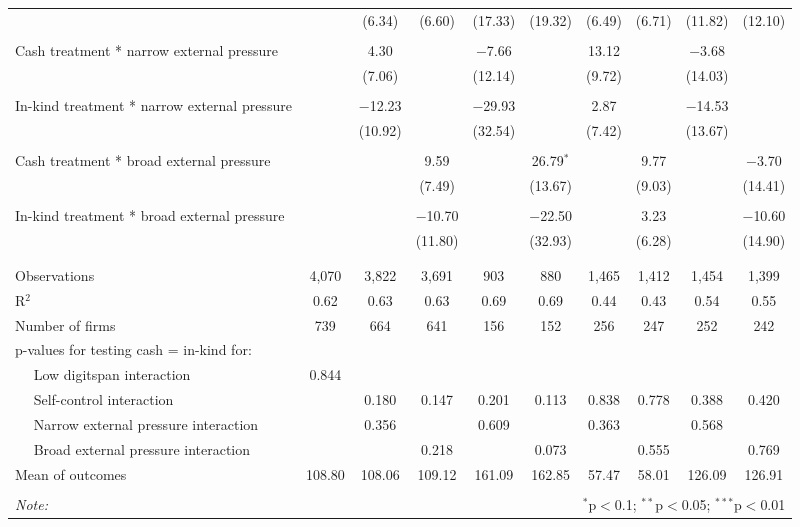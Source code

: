 \begin{table}[!htbp]
\begin{tabular}{@{\extracolsep{5pt}}lccccccccc}
  &  & (6.34) & (6.60) & (17.33) & (19.32) & (6.49) & (6.71) & (11.82) & (12.10) \\ 
  & & & & & & & & & \\ 
 Cash treatment * narrow external pressure &  & 4.30 &  & $-$7.66 &  & 13.12 &  & $-$3.68 &  \\ 
  &  & (7.06) &  & (12.14) &  & (9.72) &  & (14.03) &  \\ 
  & & & & & & & & & \\ 
 In-kind treatment * narrow external pressure &  & $-$12.23 &  & $-$29.93 &  & 2.87 &  & $-$14.53 &  \\ 
  &  & (10.92) &  & (32.54) &  & (7.42) &  & (13.67) &  \\ 
  & & & & & & & & & \\ 
 Cash treatment * broad external pressure &  &  & 9.59 &  & 26.79$^{*}$ &  & 9.77 &  & $-$3.70 \\ 
  &  &  & (7.49) &  & (13.67) &  & (9.03) &  & (14.41) \\ 
  & & & & & & & & & \\ 
 In-kind treatment * broad external pressure &  &  & $-$10.70 &  & $-$22.50 &  & 3.23 &  & $-$10.60 \\ 
  &  &  & (11.80) &  & (32.93) &  & (6.28) &  & (14.90) \\ 
  & & & & & & & & & \\ 
\hline \\[-1.8ex] 
Observations & 4,070 & 3,822 & 3,691 & 903 & 880 & 1,465 & 1,412 & 1,454 & 1,399 \\ 
R$^{2}$ & 0.62 & 0.63 & 0.63 & 0.69 & 0.69 & 0.44 & 0.43 & 0.54 & 0.55 \\ 
Number of firms & 739 & 664 & 641 & 156 & 152 & 256 & 247 & 252 & 242 \\ 
p-values for testing cash = in-kind for: &  &  &  &  &  &  &  &  &  \\ 
$\quad$ Low digitspan interaction & 0.844 &  &  &  &  &  &  &  &  \\ 
$\quad$ Self-control interaction &  & 0.180 & 0.147 & 0.201 & 0.113 & 0.838 & 0.778 & 0.388 & 0.420 \\ 
$\quad$ Narrow external pressure interaction &  & 0.356 &  & 0.609 &  & 0.363 &  & 0.568 &  \\ 
$\quad$ Broad external pressure interaction &  &  & 0.218 &  & 0.073 &  & 0.555 &  & 0.769 \\ 
Mean of outcomes & 108.80 & 108.06 & 109.12 & 161.09 & 162.85 & 57.47 & 58.01 & 126.09 & 126.91 \\ 
\hline \\[-1.8ex] 
\textit{Note:}  & \multicolumn{9}{r}{$^{*}$p$<$0.1; $^{**}$p$<$0.05; $^{***}$p$<$0.01} \\ 
\end{tabular} 
\end{table} 
